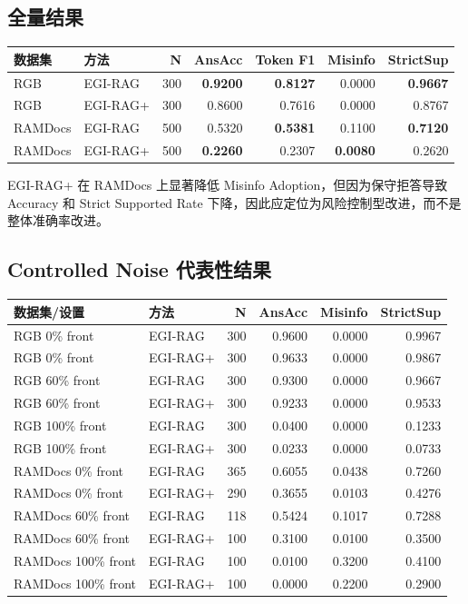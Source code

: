 \documentclass[11pt,a4paper]{article}
\newcommand{\zh}[1]{{\cjkfont #1}}
\newcommand{\gain}[1]{\textcolor{MainGreen}{\textbf{#1}}}
\newcommand{\risk}[1]{\textcolor{MainRed}{\textbf{#1}}}
\begin{document}
\subsection{\zh{全量结果}}
\begin{center}
\begin{tabular}{llrrrrr}
\hline
\zh{数据集} & \zh{方法} & N & AnsAcc & Token F1 & Misinfo & StrictSup \\
\hline
RGB & EGI-RAG & 300 & \gain{0.9200} & \gain{0.8127} & 0.0000 & \gain{0.9667} \\
RGB & EGI-RAG+ & 300 & 0.8600 & 0.7616 & 0.0000 & 0.8767 \\
RAMDocs & EGI-RAG & 500 & 0.5320 & \gain{0.5381} & 0.1100 & \gain{0.7120} \\
RAMDocs & EGI-RAG+ & 500 & \risk{0.2260} & 0.2307 & \gain{0.0080} & 0.2620 \\
\hline
\end{tabular}
\end{center}

\zh{EGI-RAG+ 在 RAMDocs 上显著降低 Misinfo Adoption，但因为保守拒答导致 Accuracy 和 Strict Supported Rate 下降，因此应定位为风险控制型改进，而不是整体准确率改进。}

\subsection{Controlled Noise \zh{代表性结果}}
\begin{center}
\begin{tabular}{llrrrr}
\hline
\zh{数据集/设置} & \zh{方法} & N & AnsAcc & Misinfo & StrictSup \\
\hline
RGB 0\% front & EGI-RAG & 300 & 0.9600 & 0.0000 & 0.9967 \\
RGB 0\% front & EGI-RAG+ & 300 & 0.9633 & 0.0000 & 0.9867 \\
RGB 60\% front & EGI-RAG & 300 & 0.9300 & 0.0000 & 0.9667 \\
RGB 60\% front & EGI-RAG+ & 300 & 0.9233 & 0.0000 & 0.9533 \\
RGB 100\% front & EGI-RAG & 300 & 0.0400 & 0.0000 & 0.1233 \\
RGB 100\% front & EGI-RAG+ & 300 & 0.0233 & 0.0000 & 0.0733 \\
RAMDocs 0\% front & EGI-RAG & 365 & 0.6055 & 0.0438 & 0.7260 \\
RAMDocs 0\% front & EGI-RAG+ & 290 & 0.3655 & 0.0103 & 0.4276 \\
RAMDocs 60\% front & EGI-RAG & 118 & 0.5424 & 0.1017 & 0.7288 \\
RAMDocs 60\% front & EGI-RAG+ & 100 & 0.3100 & 0.0100 & 0.3500 \\
RAMDocs 100\% front & EGI-RAG & 100 & 0.0100 & 0.3200 & 0.4100 \\
RAMDocs 100\% front & EGI-RAG+ & 100 & 0.0000 & 0.2200 & 0.2900 \\
\hline
\end{tabular}
\end{center}
\end{document}
